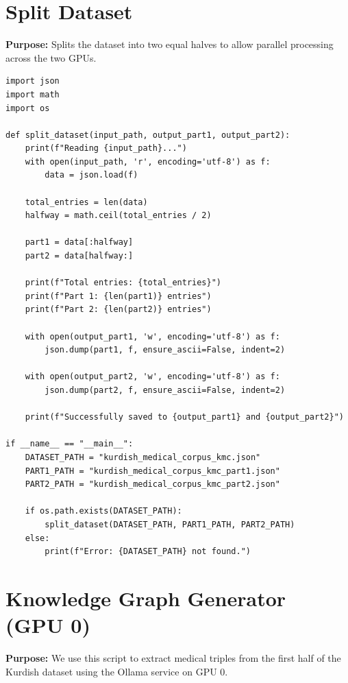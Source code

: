 \documentclass[11pt]{article}
\begin{document}
\clearpage

\section{Split Dataset} \label{sec:split}
\textbf{Purpose:} Splits the dataset into two equal halves to allow parallel processing across the two GPUs.

\begin{lstlisting}[style=pythoncode, caption={split\_dataset.py}]
import json
import math
import os

def split_dataset(input_path, output_part1, output_part2):
    print(f"Reading {input_path}...")
    with open(input_path, 'r', encoding='utf-8') as f:
        data = json.load(f)
    
    total_entries = len(data)
    halfway = math.ceil(total_entries / 2)
    
    part1 = data[:halfway]
    part2 = data[halfway:]
    
    print(f"Total entries: {total_entries}")
    print(f"Part 1: {len(part1)} entries")
    print(f"Part 2: {len(part2)} entries")
    
    with open(output_part1, 'w', encoding='utf-8') as f:
        json.dump(part1, f, ensure_ascii=False, indent=2)
    
    with open(output_part2, 'w', encoding='utf-8') as f:
        json.dump(part2, f, ensure_ascii=False, indent=2)
    
    print(f"Successfully saved to {output_part1} and {output_part2}")

if __name__ == "__main__":
    DATASET_PATH = "kurdish_medical_corpus_kmc.json"
    PART1_PATH = "kurdish_medical_corpus_kmc_part1.json"
    PART2_PATH = "kurdish_medical_corpus_kmc_part2.json"
    
    if os.path.exists(DATASET_PATH):
        split_dataset(DATASET_PATH, PART1_PATH, PART2_PATH)
    else:
        print(f"Error: {DATASET_PATH} not found.")
\end{lstlisting}

\section{Knowledge Graph Generator (GPU 0)} \label{sec:gengpu0}
\textbf{Purpose:} We use this script to extract medical triples from the first half of the Kurdish dataset using the Ollama service on GPU 0.
\end{document}
